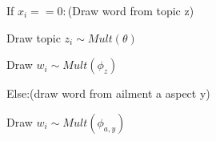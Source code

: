 \begin{myEnumerate}
\begin{myEnumerate}
\begin{myEnumerate}
\begin{myEnumerate}
    \item If $x_i == 0:$(Draw word from topic z)
    \begin{myEnumerate}
     \item Draw topic $z_i\sim Mult(\theta)$
     \item Draw $w_i \sim Mult(\phi_z)$
    \end{myEnumerate}
    \item Else:(draw word from ailment a aspect y)
    \begin{myEnumerate}
     \item Draw $w_i \sim Mult(\phi_{a,y})$
    \end{myEnumerate}
    
        \end{myEnumerate}

   \end{myEnumerate}
   


  \end{myEnumerate}


\end{myEnumerate}

